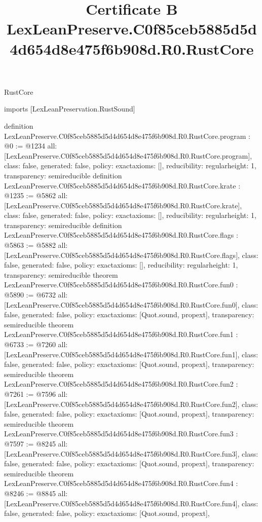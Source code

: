 \begin{lexlean}{RustCore}
\title{Certificate B LexLeanPreserve.C0f85ceb5885d5d4d654d8e475f6b908d.R0.RustCore}
\begin{coremodule}
imports [LexLeanPreservation.RustSound]

definition LexLeanPreserve.C0f85ceb5885d5d4d654d8e475f6b908d.R0.RustCore.program : @0 := @1234 {
  all: [LexLeanPreserve.C0f85ceb5885d5d4d654d8e475f6b908d.R0.RustCore.program],
  class: false,
  generated: false,
  policy: exact{axioms: []},
  reducibility: regular{height: 1},
  transparency: semireducible
}
definition LexLeanPreserve.C0f85ceb5885d5d4d654d8e475f6b908d.R0.RustCore.krate : @1235 := @5862 {
  all: [LexLeanPreserve.C0f85ceb5885d5d4d654d8e475f6b908d.R0.RustCore.krate],
  class: false,
  generated: false,
  policy: exact{axioms: []},
  reducibility: regular{height: 1},
  transparency: semireducible
}
definition LexLeanPreserve.C0f85ceb5885d5d4d654d8e475f6b908d.R0.RustCore.flags : @5863 := @5882 {
  all: [LexLeanPreserve.C0f85ceb5885d5d4d654d8e475f6b908d.R0.RustCore.flags],
  class: false,
  generated: false,
  policy: exact{axioms: []},
  reducibility: regular{height: 1},
  transparency: semireducible
}
theorem LexLeanPreserve.C0f85ceb5885d5d4d654d8e475f6b908d.R0.RustCore.fun0 : @5890 := @6732 {
  all: [LexLeanPreserve.C0f85ceb5885d5d4d654d8e475f6b908d.R0.RustCore.fun0],
  class: false,
  generated: false,
  policy: exact{axioms: [Quot.sound, propext]},
  transparency: semireducible
}
theorem LexLeanPreserve.C0f85ceb5885d5d4d654d8e475f6b908d.R0.RustCore.fun1 : @6733 := @7260 {
  all: [LexLeanPreserve.C0f85ceb5885d5d4d654d8e475f6b908d.R0.RustCore.fun1],
  class: false,
  generated: false,
  policy: exact{axioms: [Quot.sound, propext]},
  transparency: semireducible
}
theorem LexLeanPreserve.C0f85ceb5885d5d4d654d8e475f6b908d.R0.RustCore.fun2 : @7261 := @7596 {
  all: [LexLeanPreserve.C0f85ceb5885d5d4d654d8e475f6b908d.R0.RustCore.fun2],
  class: false,
  generated: false,
  policy: exact{axioms: [Quot.sound, propext]},
  transparency: semireducible
}
theorem LexLeanPreserve.C0f85ceb5885d5d4d654d8e475f6b908d.R0.RustCore.fun3 : @7597 := @8245 {
  all: [LexLeanPreserve.C0f85ceb5885d5d4d654d8e475f6b908d.R0.RustCore.fun3],
  class: false,
  generated: false,
  policy: exact{axioms: [Quot.sound, propext]},
  transparency: semireducible
}
theorem LexLeanPreserve.C0f85ceb5885d5d4d654d8e475f6b908d.R0.RustCore.fun4 : @8246 := @8845 {
  all: [LexLeanPreserve.C0f85ceb5885d5d4d654d8e475f6b908d.R0.RustCore.fun4],
  class: false,
  generated: false,
  policy: exact{axioms: [Quot.sound, propext]},
}
\end{coremodule}
\end{lexlean}
